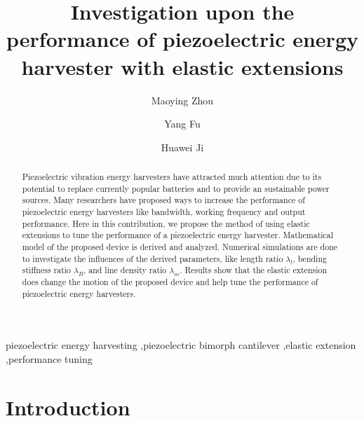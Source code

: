 \documentclass{elsarticle}
\begin{document}
\title{Investigation upon the performance of piezoelectric energy harvester with elastic extensions}

\author[1]{Maoying Zhou  }
\author[2,3]{Yang Fu }
\author[1]{Huawei Ji}


\address[1]{School of Mechanical Engineering, Hangzhou Dianzi University, Hangzhou, China}
\address[2]{School of Mechanical and Automotive Engineering, Zhejiang University of Science and Technology, Hangzhou, China}
\address[3]{The State Key Laboratory of Fluid Power and Mechatronic Systems, Zhejiang University, Hangzhou, China}


\begin{abstract}

Piezoelectric vibration energy harvesters have attracted much attention due to its potential to replace currently popular batteries and to provide an sustainable power sources. Many researchers have proposed ways to increase the performance of piezoelectric energy harvesters like bandwidth, working frequency and output performance. Here in this contribution, we propose the method of using elastic extensions to tune the performance of a piezoelectric energy harvester. Mathematical model of the proposed device is derived and analyzed. Numerical simulations are done to investigate the influences of the derived parameters, like length ratio $\lambda_l$, bending stiffness ratio $\lambda_B$, and line density ratio $\lambda_m$. Results show that the elastic extension does change the motion of the proposed device and help tune the performance of piezoelectric energy harvesters. 

\end{abstract}

\begin{keyword}
piezoelectric energy harvesting \sep piezoelectric bimorph cantilever \sep elastic extension \sep performance tuning
\end{keyword}

\maketitle


\section{Introduction}
\end{document}
